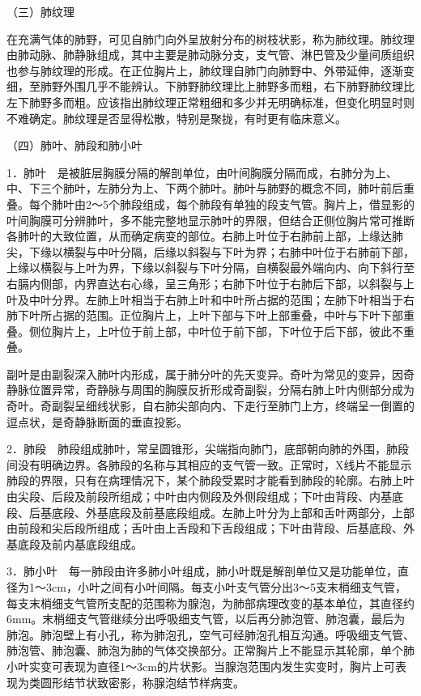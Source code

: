 （三）肺纹理

在充满气体的肺野，可见自肺门向外呈放射分布的树枝状影，称为肺纹理。肺纹理由肺动脉、肺静脉组成，其中主要是肺动脉分支，支气管、淋巴管及少量间质组织也参与肺纹理的形成。在正位胸片上，肺纹理自肺门向肺野中、外带延伸，逐渐变细，至肺野外围几乎不能辨认。下肺野肺纹理比上肺野多而粗，右下肺野肺纹理比左下肺野多而粗。应该指出肺纹理正常粗细和多少并无明确标准，但变化明显时则不难确定。肺纹理是否显得松散，特别是聚拢，有时更有临床意义。

（四）肺叶、肺段和肺小叶

1．肺叶　是被脏层胸膜分隔的解剖单位，由叶间胸膜分隔而成，右肺分为上、中、下三个肺叶，左肺分为上、下两个肺叶。肺叶与肺野的概念不同，肺叶前后重叠。每个肺叶由2～5个肺段组成，每个肺段有单独的段支气管。胸片上，借显影的叶间胸膜可分辨肺叶，多不能完整地显示肺叶的界限，但结合正侧位胸片常可推断各肺叶的大致位置，从而确定病变的部位。右肺上叶位于右肺前上部，上缘达肺尖，下缘以横裂与中叶分隔，后缘以斜裂与下叶为界；右肺中叶位于右肺前下部，上缘以横裂与上叶为界，下缘以斜裂与下叶分隔，自横裂最外端向内、向下斜行至右膈内侧部，内界直达右心缘，呈三角形；右肺下叶位于右肺后下部，以斜裂与上叶及中叶分界。左肺上叶相当于右肺上叶和中叶所占据的范围；左肺下叶相当于右肺下叶所占据的范围。正位胸片上，上叶下部与下叶上部重叠，中叶与下叶下部重叠。侧位胸片上，上叶位于前上部，中叶位于前下部，下叶位于后下部，彼此不重叠。

副叶是由副裂深入肺叶内形成，属于肺分叶的先天变异。奇叶为常见的变异，因奇静脉位置异常，奇静脉与周围的胸膜反折形成奇副裂，分隔右肺上叶内侧部分成为奇叶。奇副裂呈细线状影，自右肺尖部向内、下走行至肺门上方，终端呈一倒置的逗点状，是奇静脉断面的垂直投影。

2．肺段　肺段组成肺叶，常呈圆锥形，尖端指向肺门，底部朝向肺的外围，肺段间没有明确边界。各肺段的名称与其相应的支气管一致。正常时，X线片不能显示肺段的界限，只有在病理情况下，某个肺段受累时才能看到肺段的轮廓。右肺上叶由尖段、后段及前段所组成；中叶由内侧段及外侧段组成；下叶由背段、内基底段、后基底段、外基底段及前基底段组成。左肺上叶分为上部和舌叶两部分，上部由前段和尖后段所组成；舌叶由上舌段和下舌段组成；下叶由背段、后基底段、外基底段及前内基底段组成。

3．肺小叶　每一肺段由许多肺小叶组成，肺小叶既是解剖单位又是功能单位，直径为1～3cm，小叶之间有小叶间隔。每支小叶支气管分出3～5支末梢细支气管，每支末梢细支气管所支配的范围称为腺泡，为肺部病理改变的基本单位，其直径约6mm。末梢细支气管继续分出呼吸细支气管，以后再分肺泡管、肺泡囊，最后为肺泡。肺泡壁上有小孔，称为肺泡孔，空气可经肺泡孔相互沟通。呼吸细支气管、肺泡管、肺泡囊、肺泡为肺的气体交换部分。正常胸片上不能显示其轮廓，单个肺小叶实变可表现为直径1～3cm的片状影。当腺泡范围内发生实变时，胸片上可表现为类圆形结节状致密影，称腺泡结节样病变。


